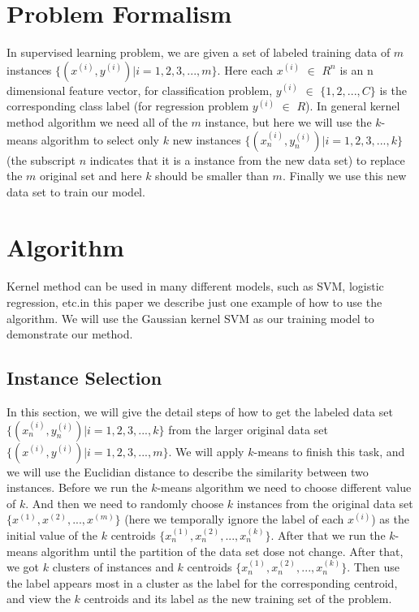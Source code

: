 \documentclass[runningheads,a4paper]{llncs}
\begin{document}
\section{Problem Formalism}
	 	In supervised learning problem, we are given a set of labeled training data of $m$
		instances $\{(x^{(i)}, y^{(i)})|i = 1, 2, 3, ...,m\}$. Here each $x^{(i)}$ $\in$ $R^{n}$ is an n dimensional
		feature vector, for classification problem, $y^{(i)}$ $\in$ $\{1,2,..., C\}$ is the corresponding
 		class label (for regression problem $y^{(i)}$ $\in$ $R$). In general kernel method
		algorithm we need all of the $m$ instance, but here we will use the $k$-means algorithm
 		to select only $k$ new instances $\{(x^{(i)}_n, y^{(i)}_n)|i = 1, 2, 3, ...,k\}$
		(the subscript $n$ indicates that it is a instance from the new data set) to replace
		the $m$ original set and here $k$ should be smaller than $m$. Finally we use this new
		data set to train our model.

\section{Algorithm}
		Kernel method can be used in many different models, such as SVM, logistic
		regression, etc.in this paper we describe just
		one example of how to use the algorithm. We will use the Gaussian kernel SVM as our 
		training model to demonstrate our method.

\subsection{Instance Selection}

		In this section, we will give the detail steps of how to get the labeled data set
		$\{(x^{(i)}_n, y^{(i)}_n)|i = 1, 2, 3, ...,k\}$ from the larger original data set 
		$\{(x^{(i)}, y^{(i)})|i = 1, 2, 3, ...,m\}$. 
		We will apply $k$-means to finish this task, and we will use the Euclidian distance to describe the similarity
		between two instances. Before we run the $k$-means algorithm
		we need to choose different value of $k$. And then we need
		to randomly choose $k$ instances from the original data set $\{x^{(1)},x^{(2)},..., x^{(m)}\}$
		(here we temporally ignore the label of each $x^{(i)}$) as the initial value of the
		$k$ centroids $\{x^{(1)}_n, x^{(2)}_n,..., x^{(k)}_n\}$. After that we run the $k$-means algorithm
		until the partition of the data set dose not change. After that, we got $k$ clusters of instances and $k$ centroids
		$\{x^{(1)}_n, x^{(2)}_n,..., x^{(k)}_n\}$. Then use the label appears most in a cluster 
		as the label for the corresponding centroid, and view the $k$ centroids 
		and its label as the new training set of the problem.
\end{document}
